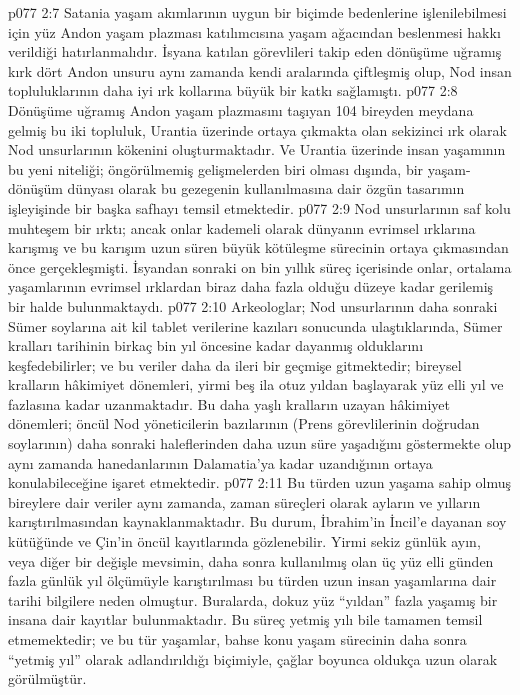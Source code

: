 \vs p077 2:7 Satania yaşam akımlarının uygun bir biçimde bedenlerine işlenilebilmesi için yüz Andon yaşam plazması katılımcısına yaşam ağacından beslenmesi hakkı verildiği hatırlanmalıdır. İsyana katılan görevlileri takip eden dönüşüme uğramış kırk dört Andon unsuru aynı zamanda kendi aralarında çiftleşmiş olup, Nod insan topluluklarının daha iyi ırk kollarına büyük bir katkı sağlamıştı.
\vs p077 2:8 Dönüşüme uğramış Andon yaşam plazmasını taşıyan 104 bireyden meydana gelmiş bu iki topluluk, Urantia üzerinde ortaya çıkmakta olan sekizinci ırk olarak Nod unsurlarının kökenini oluşturmaktadır. Ve Urantia üzerinde insan yaşamının bu yeni niteliği; öngörülmemiş gelişmelerden biri olması dışında, bir yaşam\hyp{}dönüşüm dünyası olarak bu gezegenin kullanılmasına dair özgün tasarımın işleyişinde bir başka safhayı temsil etmektedir.
\vs p077 2:9 Nod unsurlarının saf kolu muhteşem bir ırktı; ancak onlar kademeli olarak dünyanın evrimsel ırklarına karışmış ve bu karışım uzun süren büyük kötüleşme sürecinin ortaya çıkmasından önce gerçekleşmişti. İsyandan sonraki on bin yıllık süreç içerisinde onlar, ortalama yaşamlarının evrimsel ırklardan biraz daha fazla olduğu düzeye kadar gerilemiş bir halde bulunmaktaydı.
\vs p077 2:10 Arkeologlar; Nod unsurlarının daha sonraki Sümer soylarına ait kil tablet verilerine kazıları sonucunda ulaştıklarında, Sümer kralları tarihinin birkaç bin yıl öncesine kadar dayanmış olduklarını keşfedebilirler; ve bu veriler daha da ileri bir geçmişe gitmektedir; bireysel kralların hâkimiyet dönemleri, yirmi beş ila otuz yıldan başlayarak yüz elli yıl ve fazlasına kadar uzanmaktadır. Bu daha yaşlı kralların uzayan hâkimiyet dönemleri; öncül Nod yöneticilerin bazılarının (Prens görevlilerinin doğrudan soylarının) daha sonraki haleflerinden daha uzun süre yaşadığını göstermekte olup aynı zamanda hanedanlarının Dalamatia’ya kadar uzandığının ortaya konulabileceğine işaret etmektedir.
\vs p077 2:11 Bu türden uzun yaşama sahip olmuş bireylere dair veriler aynı zamanda, zaman süreçleri olarak ayların ve yılların karıştırılmasından kaynaklanmaktadır. Bu durum, İbrahim’in İncil’e dayanan soy kütüğünde ve Çin’in öncül kayıtlarında gözlenebilir. Yirmi sekiz günlük ayın, veya diğer bir değişle mevsimin, daha sonra kullanılmış olan üç yüz elli günden fazla günlük yıl ölçümüyle karıştırılması bu türden uzun insan yaşamlarına dair tarihi bilgilere neden olmuştur. Buralarda, dokuz yüz “yıldan” fazla yaşamış bir insana dair kayıtlar bulunmaktadır. Bu süreç yetmiş yılı bile tamamen temsil etmemektedir; ve bu tür yaşamlar, bahse konu yaşam sürecinin daha sonra “yetmiş yıl” olarak adlandırıldığı biçimiyle, çağlar boyunca oldukça uzun olarak görülmüştür.

